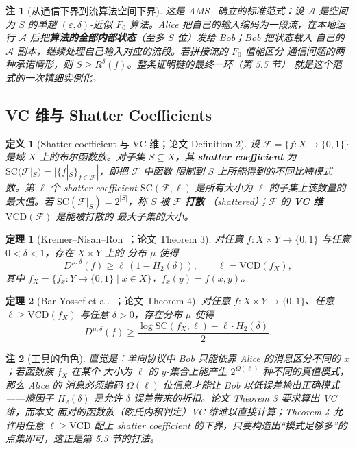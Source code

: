 \documentclass[UTF8, 11pt, a4paper, linestretch=1.15]{ctexart}
\theoremstyle{zhstyle}
\newtheorem{theorem}{定理}
\newtheorem{definition}{定义}
\newtheorem{remark}{注}
\newcommand{\eps}{\varepsilon}
\newcommand{\Fzero}{F_0}
\begin{document}
	\begin{remark}[从通信下界到流算法空间下界]
		这是 AMS~\cite{AMS99} 确立的标准范式：设 $\mathcal{A}$ 是空间为 $S$ 的单趟
		$(\eps, \delta)$-近似 $\Fzero$ 算法。Alice 把自己的输入编码为一段流，在本地运行
		$\mathcal{A}$ 后把\textbf{算法的全部内部状态}（至多 $S$ 位）发给 Bob；Bob 把状态载入
		自己的 $\mathcal{A}$ 副本，继续处理自己输入对应的流段。若拼接流的 $\Fzero$ 值能区分
		通信问题的两种承诺情形，则 $S \geq R^{\delta}(f)$。整条证明链的最终一环（第 5.5 节）
		就是这个范式的一次精细实例化。
	\end{remark}
	
	\subsection{VC 维与 Shatter Coefficients}
	
	\begin{definition}[Shatter coefficient 与 VC 维；论文 Definition 2]
		设 $\mathcal{F} = \{f: X \to \{0,1\}\}$ 是域 $X$ 上的布尔函数族。对子集
		$S \subseteq X$，其 \textbf{shatter coefficient} 为
		$\mathrm{SC}(\mathcal{F}|_S) = |\{f|_S\}_{f \in \mathcal{F}}|$，即把 $\mathcal{F}$ 中函数
		限制到 $S$ 上所能得到的不同比特模式数。第 $\ell$ 个 shatter coefficient
		$\mathrm{SC}(\mathcal{F}, \ell)$ 是所有大小为 $\ell$ 的子集上该数量的最大值。若
		$\mathrm{SC}(\mathcal{F}|_S) = 2^{|S|}$，称 $S$ 被 $\mathcal{F}$ \textbf{打散}
		（shattered）；$\mathcal{F}$ 的 \textbf{VC 维} $\mathrm{VCD}(\mathcal{F})$ 是能被打散的
		最大子集的大小。
	\end{definition}
	
	\begin{theorem}[Kremer--Nisan--Ron~\cite{KNR99}；论文 Theorem 3]
		对任意 $f: X \times Y \to \{0,1\}$ 与任意 $0 < \delta < 1$，存在 $X \times Y$ 上的
		分布 $\mu$ 使得
		\[
		D^{\mu,\delta}(f) \geq \ell\,(1 - H_2(\delta)),
		\qquad \ell = \mathrm{VCD}(f_X),
		\]
		其中 $f_X = \{f_x: Y \to \{0,1\} \mid x \in X\}$，$f_x(y) = f(x,y)$。
	\end{theorem}
	
	\begin{theorem}[Bar-Yossef et al.~\cite{BYJKS02}；论文 Theorem 4]
		对任意 $f: X \times Y \to \{0,1\}$、任意 $\ell \geq \mathrm{VCD}(f_X)$ 与任意
		$\delta > 0$，存在分布 $\mu$ 使得
		\[
		D^{\mu,\delta}(f) \geq \frac{\log \mathrm{SC}(f_X, \ell) - \ell \cdot H_2(\delta)}{2}.
		\]
	\end{theorem}
	
	\begin{remark}[工具的角色]
		直觉是：单向协议中 Bob 只能依靠 Alice 的消息区分不同的 $x$；若函数族 $f_X$ 在某个
		大小为 $\ell$ 的 $y$-集合上能产生 $2^{\Omega(\ell)}$ 种不同的真值模式，那么 Alice 的
		消息必须编码 $\Omega(\ell)$ 位信息才能让 Bob 以低误差输出正确模式——熵因子
		$H_2(\delta)$ 是允许 $\delta$ 误差带来的折扣。论文 Theorem 3 要求算出 VC 维，而本文
		面对的函数族（欧氏内积判定）VC 维难以直接计算；Theorem 4 允许用任意
		$\ell \geq \mathrm{VCD}$ 配上 shatter coefficient 的下界，只要构造出“模式足够多”的
		点集即可，这正是第 5.3 节的打法。
	\end{remark}
	
\end{document}
